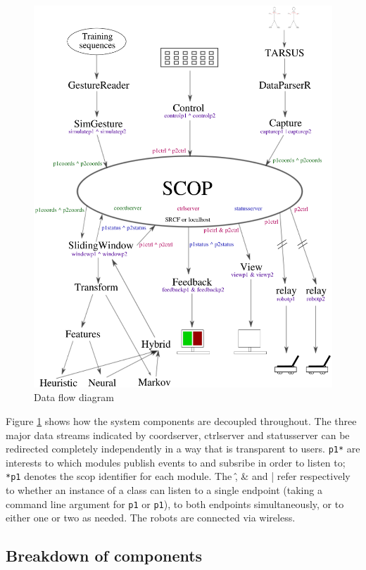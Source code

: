 \documentclass[12pt,a4,notitlepage]{report}
\renewcommand{\_}{\texttt{\symbol{95}}}
\newcommand{\<}{\texttt{\symbol{60}}}
\renewcommand{\>}{\texttt{\symbol{62}}}
\newcommand{\scopendpoint}[1]{\texttt{#1}}
\newcommand{\variable}[1]{\texttt{#1}}
\begin{document}
\begin{figure}
\centering
\includegraphics[scale=0.75,angle=0]{diagrams/dataflowdiagram.ps}
\caption{Data flow diagram}
\label{dfd}
\end{figure}

Figure \ref{dfd} shows how the system components are decoupled throughout. The three major data streams indicated by coordserver, ctrlserver and statusserver can be redirected completely independently in a way that is transparent to users. \scopendpoint{p1*} are interests to which modules publish events to and subsribe in order to listen to; \variable{*p1} denotes the scop identifier for each module. The \^, \& and | refer respectively to whether an instance of a class can listen to a single endpoint (taking a command line argument for \scopendpoint{p1} or \scopendpoint{p1}), to both endpoints simultaneously, or to either one or two as needed. The robots are connected via wireless.

\subsection{Breakdown of components}
\end{document}
